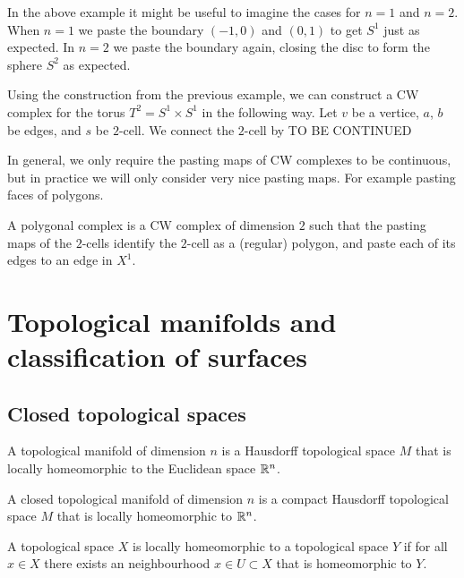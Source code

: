 \documentclass[11pt,a4paper]{article}
\begin{document}
In the above example it might be useful to imagine the cases for $n = 1$
and $n = 2$.
When $n = 1$ we paste the boundary $(-1,0)$ and $(0,1)$ to get $S^1$ just as
expected.
In $n = 2$ we paste the boundary again, closing the disc to form the sphere
$S^2$ as expected.

\begin{example}
  Using the construction from the previous example, we can construct a CW
  complex for the torus $T^2 = S^1 \times S^1$ in the following way.
  Let $v$ be a vertice, $a$, $b$ be edges, and $s$ be $2$-cell.
  We connect the $2$-cell by
  TO BE CONTINUED
\end{example}

In general, we only require the pasting maps of CW complexes to be continuous,
but in practice we will only consider very nice pasting maps.
For example pasting faces of polygons.

\begin{definition}
  A polygonal complex is a CW complex of dimension $2$ such that the pasting
  maps of the $2$-cells identify the $2$-cell as a (regular) polygon,
  and paste each of its edges to an edge in $X^1$.
\end{definition}

\newpage

\section{Topological manifolds and classification of surfaces}

\subsection{Closed topological spaces}
\begin{definition}
  A topological manifold of dimension $n$ is a Hausdorff
  topological space $M$ that is locally homeomorphic to the Euclidean
  space $\mathbb{R}^n$.
\end{definition}

\begin{definition}
  A closed topological manifold of dimension $n$ is a compact Hausdorff
  topological space $M$ that is locally homeomorphic to $\mathbb{R}^n$.
\end{definition}
\begin{remark}
  A topological space $X$ is locally homeomorphic to a topological space
  $Y$ if for all $x \in X$ there exists an neighbourhood $x \in U \subset X$
  that is homeomorphic to $Y$.
\end{remark}
\end{document}
